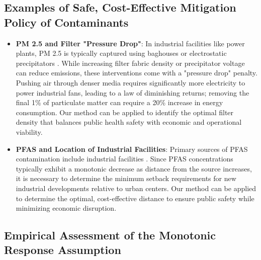 \documentclass[12pt]{article}
\begin{document}
\subsection{Examples of Safe, Cost-Effective Mitigation Policy of Contaminants} \label{sec:other_application}

\begin{itemize}
    \item \textbf{PM 2.5 and Filter "Pressure Drop"}: In industrial facilities like power plants, PM 2.5 is typically captured using baghouses or electrostatic precipitators \citep{zhao2016slip}. While increasing filter fabric density or precipitator voltage can reduce emissions, these interventions come with a "pressure drop" penalty. Pushing air through denser media requires significantly more electricity to power industrial fans, leading to a law of diminishing returns; removing the final 1\% of particulate matter can require a 20\% increase in energy consumption. Our method can be applied to identify the optimal filter density that balances public health safety with economic and operational viability.
    \item \textbf{PFAS and Location of Industrial Facilities}: Primary sources of PFAS contamination include industrial facilities \citep{park2024statistical}. Since PFAS concentrations typically exhibit a monotonic decrease as distance from the source increases, it is necessary to determine the minimum setback requirements for new industrial developments relative to urban centers. Our method can be applied to determine the optimal, cost-effective distance to ensure public safety while minimizing economic disruption.
\end{itemize}


\subsection{Empirical Assessment of the Monotonic Response Assumption }\label{sec:monotonic_assessment}
\end{document}
